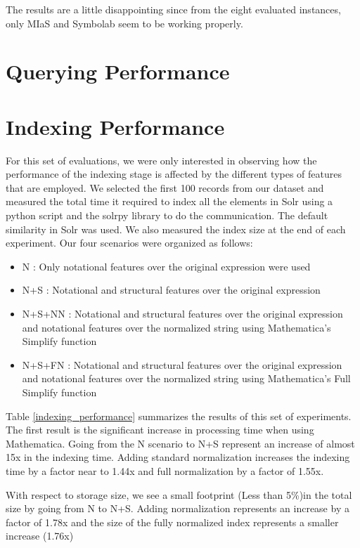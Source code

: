 The results are a little disappointing since from the eight evaluated instances, only MIaS and Symbolab seem to be working properly. 

\section{Querying Performance}


\section{Indexing Performance}
For this set of evaluations, we were only interested in observing how the performance of the indexing stage is affected by the different types of features that are employed. We selected the first 100 records from our dataset and measured the total time it required to index all the elements in Solr using a python script and the solrpy library to do the communication. The default similarity in Solr was used. We also measured the index size at the end of each experiment.
Our four scenarios were organized as follows:
\begin{itemize}
\item N : Only notational features over the original expression were used
\item N+S : Notational and structural features over the original expression
\item N+S+NN : Notational and structural features over the original expression and notational features over the normalized string using Mathematica's Simplify function
\item N+S+FN : Notational and structural features over the original expression and notational features over the normalized string using Mathematica's Full Simplify function
\end{itemize}

Table \ref{indexing_performance} summarizes the results of this set of experiments. The first result is the significant increase in processing time when using Mathematica. Going from the N scenario to N+S represent an increase of almost 15x in the indexing time. Adding standard normalization increases the indexing time by a factor near to 1.44x and full normalization by a factor of 1.55x.

With respect to storage size, we see a small footprint (Less than 5\%)in the total size by going from N to N+S. Adding normalization represents an increase by a factor of 1.78x and the size of the fully normalized index represents a smaller increase (1.76x)


